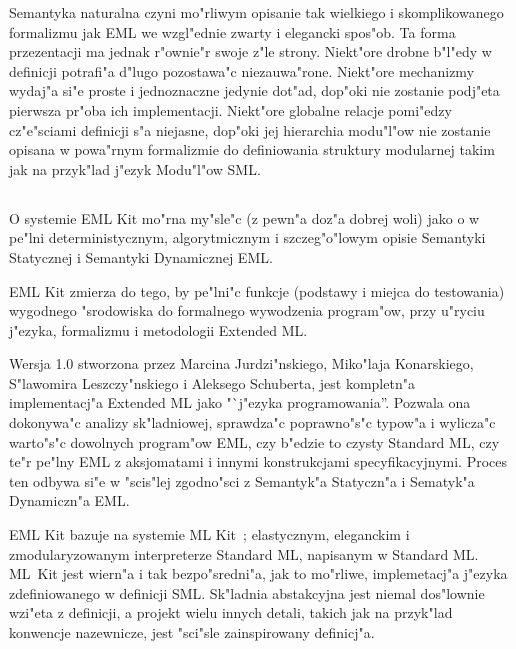 Semantyka naturalna czyni mo"rliwym opisanie tak wielkiego
i skomplikowanego formalizmu jak EML we wzgl"ednie zwarty i elegancki spos"ob.
Ta forma przezentacji ma jednak r"ownie"r swoje z"le strony.
Niekt"ore drobne b"l"edy w definicji potrafi"a d"lugo pozostawa"c niezauwa"rone.
Niekt"ore mechanizmy wydaj"a si"e proste i jednoznaczne jedynie dot"ad,
dop"oki nie zostanie podj"eta pierwsza pr"oba ich implementacji.
Niekt"ore globalne relacje pomi"edzy cz"e"sciami definicji
s"a niejasne, dop"oki jej hierarchia modu"l"ow nie zostanie
opisana w powa"rnym formalizmie do definiowania struktury modularnej
takim jak na przyk"lad j"ezyk Modu"l"ow SML.

\subsection{\seckit}
\label{sec:kit}

O systemie EML Kit mo"rna my"sle"c (z pewn"a doz"a dobrej woli)
jako o w pe"lni deterministycznym, algorytmicznym i szczeg"o"lowym
opisie Semantyki Statycznej i Semantyki Dynamicznej EML.

EML Kit zmierza do tego, by pe"lni"c funkcje (podstawy i miejca do testowania)
wygodnego "srodowiska do formalnego wywodzenia program"ow,
przy u"ryciu j"ezyka, formalizmu i metodologii Extended ML.

Wersja 1.0 stworzona przez Marcina Jurdzi"nskiego, Miko"laja Konarskiego, 
S"lawomira Leszczy"nskiego i Aleksego Schuberta,
jest kompletn"a implementacj"a Extended ML jako "`j"ezyka programowania''.
Pozwala ona dokonywa"c analizy sk"ladniowej, sprawdza"c poprawno"s"c typow"a
i wylicza"c warto"s"c dowolnych program"ow EML, czy b"edzie to czysty Standard ML,
czy te"r pe"lny EML z aksjomatami i innymi konstrukcjami specyfikacyjnymi.
Proces ten odbywa si"e w "scis"lej zgodno"sci z Semantyk"a Statyczn"a i Sematyk"a Dynamiczn"a EML.

EML Kit bazuje na systemie ML Kit~\cite{BRTT93};
elastycznym, eleganckim i zmodularyzowanym interpreterze Standard ML, napisanym w Standard ML.
ML~Kit jest wiern"a i tak bezpo"sredni"a, jak to mo"rliwe,
implemetacj"a j"ezyka zdefiniowanego w definicji SML.
Sk"ladnia abstakcyjna jest niemal dos"lownie wzi"eta z definicji,
a projekt wielu innych detali, takich jak na przyk"lad konwencje nazewnicze,
jest "sci"sle zainspirowany definicj"a.

\subsection{\secdepend}
\label{sec:depend}

